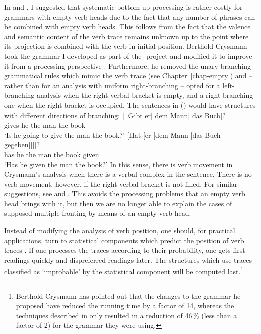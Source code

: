 \begin{exe}
\begin{xlist}
In  and , I suggested that systematic bottom-up
processing is rather costly for grammars with empty verb heads due to the fact that any number of phrases
can be combined with empty verb heads. This follows from the fact that the valence and semantic content of
the verb trace remains unknown up to the point where its projection is combined with the verb in initial
position.
Berthold Crysmann took the grammar I developed as part of the \verbmobil-project \citep{MK2000a} and modified
it to improve it from a processing perspective \citep{Crysmann2003b}. Furthermore, he removed the unary-branching grammatical rules
which mimic the verb trace (see Chapter~\ref{chap-empty}) and -- rather than for an analysis with uniform right-branching -- opted for a left-branching 
analysis when the right verbal bracket is empty, and a right-branching one when the right bracket is occupied. The sentences in  
() would have structures with different directions of branching:
\eal
\ex 
\gll {}[[[Gibt er] dem Mann] das Buch]?\\
      \hspaceThis{[[[}gives he the man the book\\
\glt `Is he going to give the man the book?'
\ex 
\gll {}[Hat [er [dem Mann [das Buch gegeben]]]]?\\
     \spacebr{}has \spacebr{}he \spacebr{}the man \spacebr{}the book given\\
\glt `Has he given the man the book?'
\zl
In this sense, there is verb movement in Crysmann's analysis when there is a verbal complex in the sentence.
There is no verb movement, however, if the right verbal bracket is not filled. For similar suggestions, see
 and . This avoids the processing problems that
an empty verb head brings with it, but then we are no longer able to explain the cases of supposed
multiple fronting by means of an empty verb head.

Instead of modifying the analysis of verb position, one should, for practical applications, turn to statistical components 
which predict the position of verb traces \citep{BFGKKN96a,FBCKS2003a}. If one processes the traces according
to their probability, one gets first readings quickly and dispreferred readings later. The structures which use traces
classified as `improbable' by the statistical component will be computed last.\footnote{
	Berthold Crysmann has pointed out that the changes to the grammar he proposed
	have reduced the running time by a factor of 14, whereas the techniques described
	in  only resulted in a reduction of 46\,\% (less than a factor of 2)
	for the grammar they were using.

}
\end{xlist}
\end{exe}
